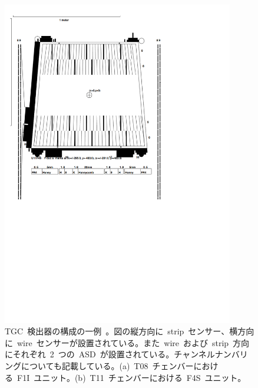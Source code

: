 \begin{figure}[H]
\begin{minipage}{0.49\hsize}
        \includegraphics[width=0.9\textwidth]{img/pdf/u11f4s.pdf}
        \subcaption{}
        \end{minipage}
        \caption[TGC~検出器の構成の一例]{TGC~検出器の構成の一例~\cite{URL:04}。図の縦方向に~strip~センサー、横方向に~wire~センサーが設置されている。また~wire~および~strip~方向にそれぞれ~2~つの~ASD~が設置されている。チャンネルナンバリングについても記載している。(a)~T08~チェンバーにおける~F1I~ユニット。(b)~T11~チェンバーにおける~F4S~ユニット。}
        \label{fig:tgcT}
\end{figure}

